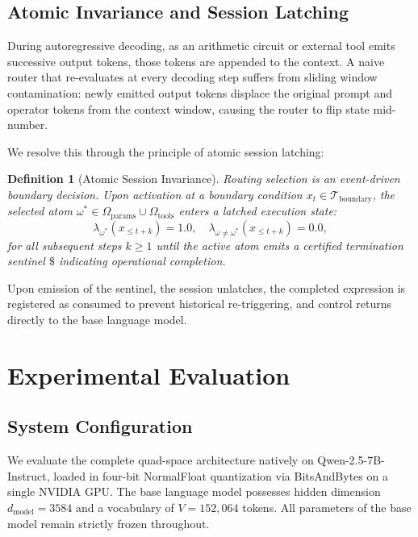 \documentclass[preprint,12pt]{elsarticle}
\newtheorem{definition}{Definition}
\begin{document}
\subsection{Atomic Invariance and Session Latching}

During autoregressive decoding, as an arithmetic circuit or external tool emits successive output tokens, those tokens are appended to the context. A naive router that re-evaluates at every decoding step suffers from sliding window contamination: newly emitted output tokens displace the original prompt and operator tokens from the context window, causing the router to flip state mid-number.

We resolve this through the principle of atomic session latching:
\begin{definition}[Atomic Session Invariance]
Routing selection is an event-driven boundary decision. Upon activation at a boundary condition $x_t \in \mathcal{T}_{\mathrm{boundary}}$, the selected atom $\omega^* \in \Omega_{\mathrm{params}} \cup \Omega_{\mathrm{tools}}$ enters a latched execution state:
\begin{equation}
\lambda_{\omega^*}(x_{\le t+k}) = 1.0, \quad \lambda_{\omega \neq \omega^*}(x_{\le t+k}) = 0.0,
\end{equation}
for all subsequent steps $k \ge 1$ until the active atom emits a certified termination sentinel $\$$ indicating operational completion.
\end{definition}

Upon emission of the sentinel, the session unlatches, the completed expression is registered as consumed to prevent historical re-triggering, and control returns directly to the base language model.

\section{Experimental Evaluation}

\subsection{System Configuration}

We evaluate the complete quad-space architecture natively on Qwen-2.5-7B-Instruct, loaded in four-bit NormalFloat quantization via BitsAndBytes on a single NVIDIA GPU. The base language model possesses hidden dimension $d_{\mathrm{model}} = 3584$ and a vocabulary of $V = 152{,}064$ tokens. All parameters of the base model remain strictly frozen throughout.
\end{document}
